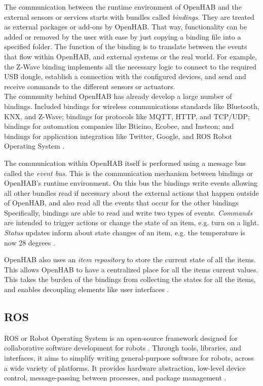 The communication between the runtime environment of OpenHAB and the external sensors or services starts with bundles called \textit{bindings}. They are treated as external packages or add-ons by OpenHAB. That way, functionality can be added or removed by the user with ease by just copying a binding file into a specified folder. The function of the binding is to translate between the events that flow within OpenHAB, and external systems \cite{openhabBinding} or the real world. For example, the Z-Wave binding implements all the necessary logic to connect to the required USB dongle, establish a connection with the configured devices, and send and receive commands to the different sensors or actuators. \\
The community behind OpenHAB has already develop a large number of bindings. Included bindings for wireless communications standards like Bluetooth, KNX, and Z-Wave; bindings for protocols like MQTT, HTTP, and TCP/UDP; bindings for automation companies like Bticino, Ecobee, and Insteon; and bindings for application integration like Twitter, Google, and ROS Robot Operating System \cite{openhabBinding}.

The communication within OpenHAB itself is performed using a message bus called the \textit{event bus}. This is the communication mechanism between bindings or OpenHAB's runtime environment. On this bus the bindings write events allowing all other bundles read if necessary about the external actions that happen outside of OpenHAB, and also read all the events that occur for the other bindings \\
Specifically, bindings are able to read and write two types of events. \textit{Commands} are intended to trigger actions or change the state of an item, e.g. turn on a light. \textit{Status} updates inform about state changes of an item, e.g. the temperature is now 28 degrees \cite{openhabBinding}.

OpenHAB also uses an \textit{item repository} to store the current state of all the items. This allows OpenHAB to have a centralized place for all the items current values. This takes the burden of the bindings from collecting the states for all the items, and enables decoupling elements like user interfaces \cite{openhabBinding}.


\subsection{ROS}

ROS or Robot Operating System is an open-source framework designed for collaborative software development for robots \cite{ros}. Through tools, libraries, and interfaces, it aims to simplify writing general-purpose software for robots, across a wide variety of platforms. It provides hardware abstraction, low-level device control, message-passing between processes, and package management \cite{rosdocu}. 

